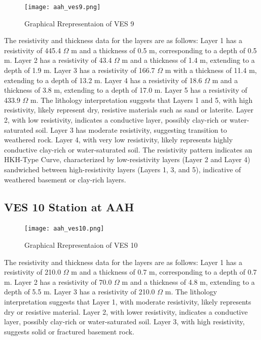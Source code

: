 \documentclass[12pt,a4paper]{report}
\begin{document}
\begin{figure}[H]
    \centering
    \texttt{[image: aah\_ves9.png]}
    \caption{Graphical Rrepresentaion of VES 9}
    \label{fig:AAH_VES_9_Curve}
\end{figure}
The resistivity and thickness data for the layers are as follows: Layer 1 has a resistivity of 445.4 $\Omega$ m and a thickness of 0.5 m, corresponding to a depth of 0.5 m. Layer 2 has a resistivity of 43.4 $\Omega$ m and a thickness of 1.4 m, extending to a depth of 1.9 m. Layer 3 has a resistivity of 166.7 $\Omega$ m with a thickness of 11.4 m, extending to a depth of 13.2 m. Layer 4 has a resistivity of 18.6 $\Omega$ m and a thickness of 3.8 m, extending to a depth of 17.0 m. Layer 5 has a resistivity of 433.9 $\Omega$ m. The lithology interpretation suggests that Layers 1 and 5, with high resistivity, likely represent dry, resistive materials such as sand or laterite. Layer 2, with low resistivity, indicates a conductive layer, possibly clay-rich or water-saturated soil. Layer 3 has moderate resistivity, suggesting transition to weathered rock. Layer 4, with very low resistivity, likely represents highly conductive clay-rich or water-saturated soil. The resistivity pattern indicates an HKH-Type Curve, characterized by low-resistivity layers (Layer 2 and Layer 4) sandwiched between high-resistivity layers (Layers 1, 3, and 5), indicative of weathered basement or clay-rich layers.

\subsection{VES 10 Station at AAH}

\begin{figure}[H]
    \centering
    \texttt{[image: aah\_ves10.png]}
    \caption{Graphical Rrepresentaion of VES 10}
    \label{fig:AAH_VES_10_Curve}
\end{figure}
The resistivity and thickness data for the layers are as follows: Layer 1 has a resistivity of 210.0 $\Omega$ m and a thickness of 0.7 m, corresponding to a depth of 0.7 m. Layer 2 has a resistivity of 70.0 $\Omega$ m and a thickness of 4.8 m, extending to a depth of 5.5 m. Layer 3 has a resistivity of 210.0 $\Omega$ m. The lithology interpretation suggests that Layer 1, with moderate resistivity, likely represents dry or resistive material. Layer 2, with lower resistivity, indicates a conductive layer, possibly clay-rich or water-saturated soil. Layer 3, with high resistivity, suggests solid or fractured basement rock.
\end{document}

